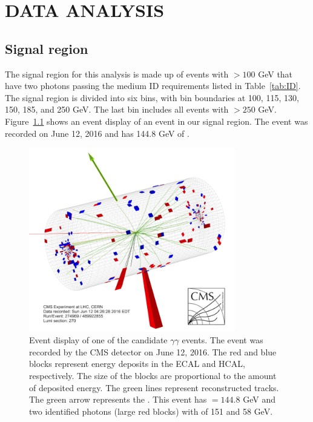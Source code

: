 \chapter{DATA ANALYSIS}
\label{chap:DataAnalysis}

\section{Signal region}
The signal region for this analysis is made up of events with \ETmiss $> 100$ GeV that have two photons passing the medium ID requirements listed in Table~\ref{tab:ID}. The signal region is divided into six \ETmiss bins, with bin boundaries at 100, 115, 130, 150, 185, and 250 GeV. The last bin includes all events with \ETmiss $> 250$ GeV. Figure~\ref{fig:eventDisplay} shows an event display of an event in our signal region. The event was recorded on June 12, 2016 and has 144.8 GeV of \ETmiss.

\begin{figure}[h]
\begin{center}
\includegraphics[width=0.8\textwidth]{Figures/DataAnalysis/eventDisplay.png}
\end{center}
\caption{Event display of one of the candidate $\gamma\gamma$ events. The event was recorded by the CMS detector on June 12, 2016. The red and blue blocks represent energy deposits in the ECAL and HCAL, respectively. The size of the blocks are proportional to the amount of deposited energy. The green lines represent reconstructed tracks. The green arrow represents the \ETmiss. This event has \ETmiss $ = 144.8$ GeV and two identified photons (large red blocks) with \pT of 151 and 58 GeV. }
\label{fig:eventDisplay}
\end{figure}


